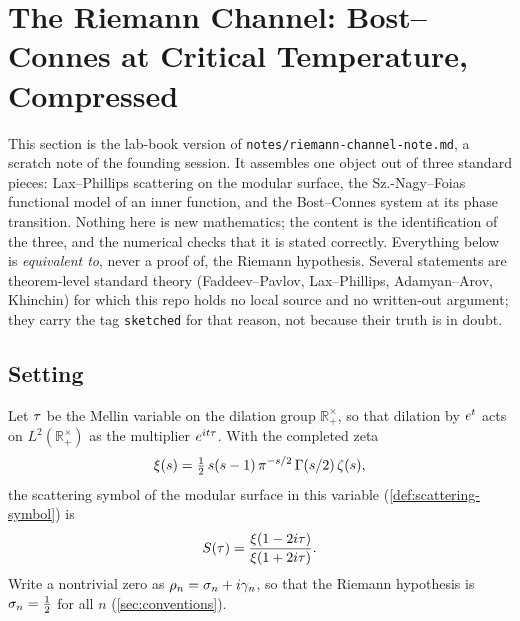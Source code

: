 
\section{The Riemann Channel: Bost--Connes at Critical Temperature, Compressed}
\label{sec:riemann-channel}

This section is the lab-book version of \texttt{notes/riemann-channel-note.md}, a scratch
note of the founding session. It assembles one object out of three standard pieces:
Lax--Phillips scattering on the modular surface, the Sz.-Nagy--Foias functional model of
an inner function, and the Bost--Connes system at its phase transition. Nothing here is
new mathematics; the content is the identification of the three, and the numerical checks
that it is stated correctly. Everything below is \emph{equivalent to}, never a proof of,
the Riemann hypothesis. Several statements are theorem-level standard theory
(Faddeev--Pavlov, Lax--Phillips, Adamyan--Arov, Khinchin) for which this repo holds no
local source and no written-out argument; they carry the tag \texttt{sketched} for that
reason, not because their truth is in doubt.

\subsection{Setting}

Let $\tau$ be the Mellin variable on the dilation group $\mathbb R_+^\times$, so that
dilation by $e^{t}$ acts on $L^2(\mathbb R_+^\times)$ as the multiplier
$e^{it\tau}$. With the completed zeta
\[
  \xi(s) = \tfrac12\,s(s-1)\,\pi^{-s/2}\,\Gamma(s/2)\,\zeta(s),
\]
the scattering symbol of the modular surface in this variable
(\cref{def:scattering-symbol}) is
\[
  S(\tau) = \frac{\xi(1-2i\tau)}{\xi(1+2i\tau)} .
\]
Write a nontrivial zero as $\rho_n = \sigma_n + i\gamma_{n}$, so that the Riemann hypothesis
is $\sigma_n = \frac12$ for all $n$ (\cref{sec:conventions}).

